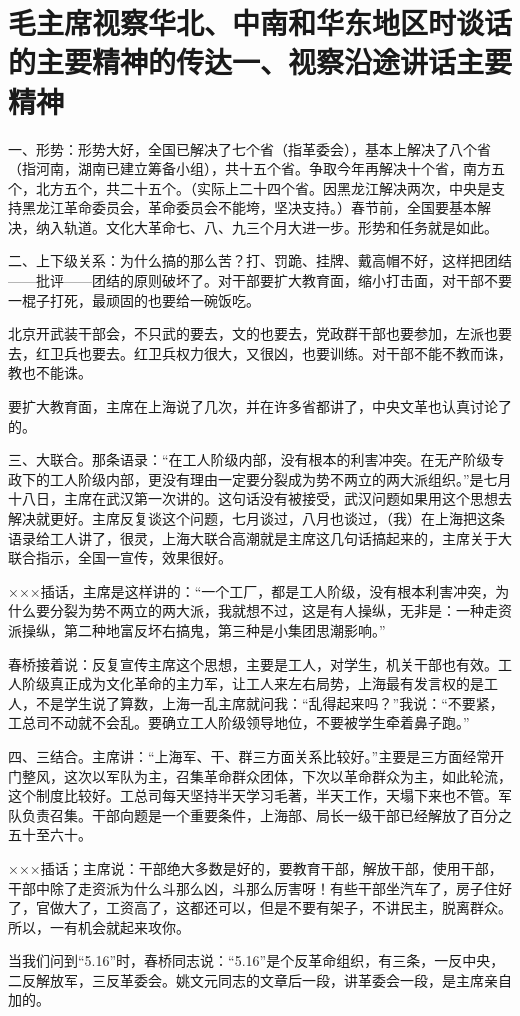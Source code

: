 \section[毛主席视察华北、中南和华东地区时谈话的主要精神的传达一、视察沿途讲话主要精神]{毛主席视察华北、中南和华东地区时谈话的主要精神的传达一、视察沿途讲话主要精神}


一、形势：形势大好，全国已解决了七个省（指革委会），基本上解决了八个省（指河南，湖南已建立筹备小组），共十五个省。争取今年再解决十个省，南方五个，北方五个，共二十五个。（实际上二十四个省。因黑龙江解决两次，中央是支持黑龙江革命委员会，革命委员会不能垮，坚决支持。）春节前，全国要基本解决，纳入轨道。文化大革命七、八、九三个月大进一步。形势和任务就是如此。

二、上下级关系：为什么搞的那么苦？打、罚跪、挂牌、戴高帽不好，这样把团结——批评——团结的原则破坏了。对干部要扩大教育面，缩小打击面，对干部不要一棍子打死，最顽固的也要给一碗饭吃。

北京开武装干部会，不只武的要去，文的也要去，党政群干部也要参加，左派也要去，红卫兵也要去。红卫兵权力很大，又很凶，也要训练。对干部不能不教而诛，教也不能诛。

要扩大教育面，主席在上海说了几次，并在许多省都讲了，中央文革也认真讨论了的。

三、大联合。那条语录：“在工人阶级内部，没有根本的利害冲突。在无产阶级专政下的工人阶级内部，更没有理由一定要分裂成为势不两立的两大派组织。”是七月十八日，主席在武汉第一次讲的。这句话没有被接受，武汉问题如果用这个思想去解决就更好。主席反复谈这个问题，七月谈过，八月也谈过，（我）在上海把这条语录给工人讲了，很灵，上海大联合高潮就是主席这几句话搞起来的，主席关于大联合指示，全国一宣传，效果很好。

×××插话，主席是这样讲的：“一个工厂，都是工人阶级，没有根本利害冲突，为什么要分裂为势不两立的两大派，我就想不过，这是有人操纵，无非是：一种走资派操纵，第二种地富反坏右搞鬼，第三种是小集团思潮影响。”

春桥接着说：反复宣传主席这个思想，主要是工人，对学生，机关干部也有效。工人阶级真正成为文化革命的主力军，让工人来左右局势，上海最有发言权的是工人，不是学生说了算数，上海一乱主席就问我：“乱得起来吗？”我说：“不要紧，工总司不动就不会乱。要确立工人阶级领导地位，不要被学生牵着鼻子跑。”

四、三结合。主席讲：“上海军、干、群三方面关系比较好。”主要是三方面经常开门整风，这次以军队为主，召集革命群众团体，下次以革命群众为主，如此轮流，这个制度比较好。工总司每天坚持半天学习毛著，半天工作，天塌下来也不管。军队负责召集。干部向题是一个重要条件，上海部、局长一级干部已经解放了百分之五十至六十。

×××插话；主席说：干部绝大多数是好的，要教育干部，解放干部，使用干部，干部中除了走资派为什么斗那么凶，斗那么厉害呀！有些干部坐汽车了，房子住好了，官做大了，工资高了，这都还可以，但是不要有架子，不讲民主，脱离群众。所以，一有机会就起来攻你。

当我们问到“5.16”时，春桥同志说：“5.16”是个反革命组织，有三条，一反中央，二反解放军，三反革委会。姚文元同志的文章后一段，讲革委会一段，是主席亲自加的。

